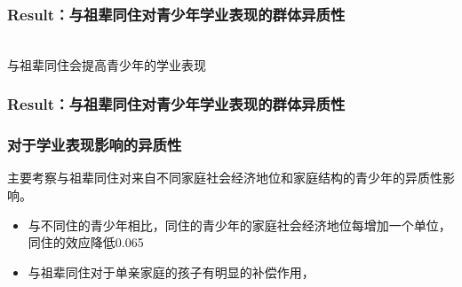 \documentclass{beamer}
\begin{document}
\begin{frame}
\frametitle{Result：与祖辈同住对青少年学业表现的群体异质性}	
	\\ 与祖辈同住会提高青少年的学业表现
\end{frame}

\begin{frame}
\frametitle{Result：与祖辈同住对青少年学业表现的群体异质性}	
\end{frame}

\begin{frame}
	\frametitle{对于学业表现影响的异质性}
主要考察与祖辈同住对来自不同家庭社会经济地位和家庭结构的青少年的异质性影响。
\begin{itemize}
	\item 与不同住的青少年相比，同住的青少年的家庭社会经济地位每增加一个单位，同住的效应降低0.065
	\item 与祖辈同住对于单亲家庭的孩子有明显的补偿作用，
\end{itemize}
\end{frame}
\end{document}
